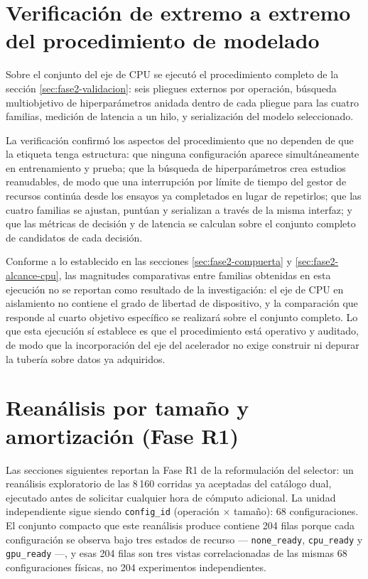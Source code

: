 \documentclass[12pt,oneside,spanish]{book}
\begin{document}
\section{Verificación de extremo a extremo del procedimiento de modelado}
\label{sec:resultados-tuberia}

Sobre el conjunto del eje de CPU se ejecutó el procedimiento completo de la sección \ref{sec:fase2-validacion}: seis pliegues externos por operación, búsqueda multiobjetivo de hiperparámetros anidada dentro de cada pliegue para las cuatro familias, medición de latencia a un hilo, y serialización del modelo seleccionado.

La verificación confirmó los aspectos del procedimiento que no dependen de que la etiqueta tenga estructura: que ninguna configuración aparece simultáneamente en entrenamiento y prueba; que la búsqueda de hiperparámetros crea estudios reanudables, de modo que una interrupción por límite de tiempo del gestor de recursos continúa desde los ensayos ya completados en lugar de repetirlos; que las cuatro familias se ajustan, puntúan y serializan a través de la misma interfaz; y que las métricas de decisión y de latencia se calculan sobre el conjunto completo de candidatos de cada decisión.

Conforme a lo establecido en las secciones \ref{sec:fase2-compuerta} y \ref{sec:fase2-alcance-cpu}, las magnitudes comparativas entre familias obtenidas en esta ejecución no se reportan como resultado de la investigación: el eje de CPU en aislamiento no contiene el grado de libertad de dispositivo, y la comparación que responde al cuarto objetivo específico se realizará sobre el conjunto completo. Lo que esta ejecución sí establece es que el procedimiento está operativo y auditado, de modo que la incorporación del eje del acelerador no exige construir ni depurar la tubería sobre datos ya adquiridos.

\section{Reanálisis por tamaño y amortización (Fase R1)}
\label{sec:resultados-r1-intro}

Las secciones siguientes reportan la Fase R1 de la reformulación del selector: un reanálisis exploratorio de las 8\,160 corridas ya aceptadas del catálogo dual, ejecutado antes de solicitar cualquier hora de cómputo adicional. La unidad independiente sigue siendo \texttt{config\_id} (operación $\times$ tamaño): 68 configuraciones. El conjunto compacto que este reanálisis produce contiene 204 filas porque cada configuración se observa bajo tres estados de recurso --- \texttt{none\_ready}, \texttt{cpu\_ready} y \texttt{gpu\_ready} ---, y esas 204 filas son tres vistas correlacionadas de las mismas 68 configuraciones físicas, no 204 experimentos independientes.
\end{document}
